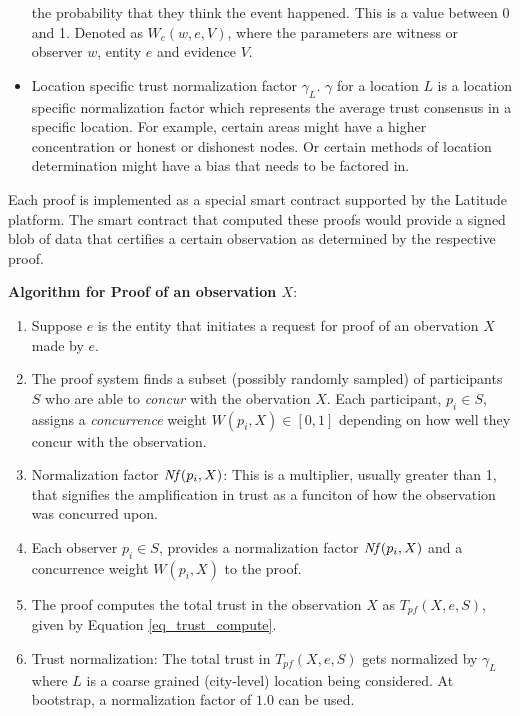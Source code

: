 \begin{itemize}
        the probability that they think the event happened. This is a value between 0 and 1. Denoted as $W_c(w, e, V)$,
        where the parameters are witness or observer $w$, entity $e$ and evidence $V$.
    \item Location specific trust normalization factor $\gamma_L$. $\gamma$ for a location $L$ is a location specific
        normalization factor which represents the average trust consensus in a specific location. For example, certain
        areas might have a higher concentration or honest or dishonest nodes. Or certain methods of location
        determination might have a bias that needs to be factored in.
\end{itemize}

Each proof is implemented as a special smart contract supported by the Latitude platform. The smart contract that
computed these proofs would provide a signed blob of data that certifies a certain observation as determined by the
respective proof.

\noindent
{\bf Algorithm for Proof of an observation $X$}:
\begin{enumerate}
    \item Suppose $e$ is the entity that initiates a request for proof of an obervation $X$ made by $e$.
    \item The proof system finds a subset (possibly randomly sampled) of participants $S$ who are able
        to {\it concur} with the obervation $X$. Each participant, $p_i \in S$, assigns a {\em concurrence} weight
        $W(p_i, X) \in [0,1]$ depending on how well they concur with the observation.
    \item Normalization factor $\mathit{Nf}(p_i, X)$: This is a multiplier, usually greater than 1, that signifies the
        amplification in trust as a funciton of how the observation was concurred upon. 
    \item Each observer $p_i \in S$, provides a normalization factor $\mathit{Nf}(p_i, X)$ and a concurrence weight $W(p_i, X)$
        to the proof.
    \item The proof computes the total trust in the observation $X$ as $T_{pf}(X, e, S)$, given by Equation
        \ref{eq_trust_compute}.
    \item Trust normalization: The total trust in $T_{pf}(X, e, S)$ gets normalized by $\gamma_L$ where $L$ is a coarse
        grained (city-level) location being considered. At bootstrap, a normalization factor of $1.0$ can be used.
\end{enumerate}

